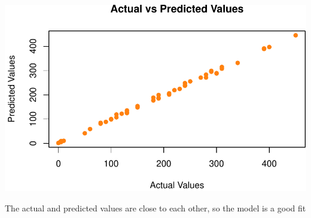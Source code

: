 \documentclass[
]{article}
\begin{document}
\begin{center}\includegraphics{Statistical_Learning_Final_Report_files/figure-latex/accuracy_glm-1} \end{center}

The actual and predicted values are close to each other, so the model is
a good fit
\end{document}
